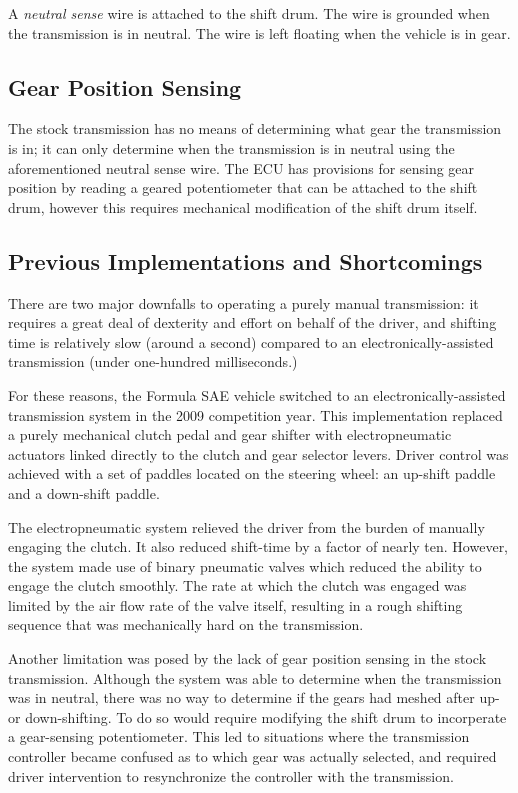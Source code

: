 A \emph{neutral sense} wire is attached to the shift drum. The wire is grounded when the transmission is in neutral. The wire is left floating when the vehicle is in gear. 

\subsection{Gear Position Sensing}

The stock transmission has no means of determining what gear the transmission is in; it can only determine when the transmission is in neutral using the aforementioned neutral sense wire. The ECU has provisions for sensing gear position by reading a geared potentiometer that can be attached to the shift drum, however this requires mechanical modification of the shift drum itself.

\subsection{Previous Implementations and Shortcomings}

There are two major downfalls to operating a purely manual transmission: it requires a great deal of dexterity and effort on behalf of the driver, and shifting time is relatively slow (around a second) compared to an electronically-assisted transmission (under one-hundred milliseconds.) 

For these reasons, the Formula SAE vehicle switched to an electronically-assisted transmission system in the 2009 competition year. This implementation replaced a purely mechanical clutch pedal and gear shifter with electropneumatic actuators linked directly to the clutch and gear selector levers. Driver control was achieved with a set of paddles located on the steering wheel: an up-shift paddle and a down-shift paddle.

The electropneumatic system relieved the driver from the burden of manually engaging the clutch. It also reduced shift-time by a factor of nearly ten. However, the system made use of binary pneumatic valves which reduced the ability to engage the clutch smoothly. The rate at which the clutch was engaged was limited by the air flow rate of the valve itself, resulting in a rough shifting sequence that was mechanically hard on the transmission. 

Another limitation was posed by the lack of gear position sensing in the stock transmission. Although the system was able to determine when the transmission was in neutral, there was no way to determine if the gears had meshed after up- or down-shifting. To do so would require modifying the shift drum to incorperate a gear-sensing potentiometer. This led to situations where the transmission controller became confused as to which gear was actually selected, and required driver intervention to resynchronize the controller with the transmission.

